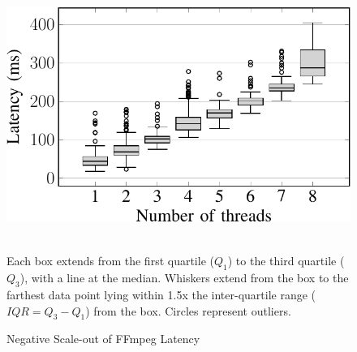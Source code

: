 \begin{figure}
\centering
\includegraphics[width=0.6\linewidth]{chapter5/FIGS/histo-multi-threaded-ffmpeg.pdf}
\begin{captext}
  \\[0.2cm]
  Each box extends from the first quartile ($Q_1$) to the third
  quartile ($Q_3$), with a line at the median. Whiskers extend from
  the box to the farthest data point lying within 1.5x the
  inter-quartile range ($IQR = Q_3-Q_1$) from the box. Circles
  represent outliers.
\end{captext}
\caption{Negative Scale-out of FFmpeg Latency}
\label{fig:ffmpeg-threads-box-plot2}
\end{figure}

